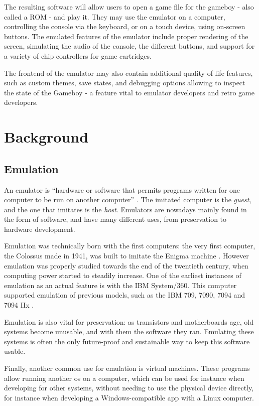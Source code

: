 \documentclass[11pt]{report}
\begin{document}
The resulting software will allow users to open a game file for the gameboy - also called a ROM - and play it. They may use the emulator on a computer, controlling the console via the keyboard, or on a touch device, using on-screen buttons. The emulated features of the emulator include proper rendering of the screen, simulating the audio of the console, the different buttons, and support for a variety of chip controllers for game cartridges.

The frontend of the emulator may also contain additional quality of life features, such as custom themes, save states, and debugging options allowing to inspect the state of the Gameboy - a feature vital to emulator developers and retro game developers.

\chapter{Background}

\section{Emulation}

An emulator is ``hardware or software that permits programs written for one computer to be run on another computer'' \cite{emulator_def}. The imitated computer is the \textit{guest}, and the one that imitates is the \textit{host}. Emulators are nowadays mainly found in the form of software, and have many different uses, from preservation to hardware development.

Emulation was technically born with the first computers: the very first computer, the Colossus made in 1941, was built to imitate the Enigma machine \cite{emulator_origin}. However emulation was properly studied towards the end of the twentieth century, when computing power started to steadily increase. One of the earliest instances of emulation as an actual feature is with the IBM System/360. This computer supported emulation of previous models, such as the IBM 709, 7090, 7094 and 7094 IIx \cite{ibm_emulation}.

Emulation is also vital for preservation: as transistors and motherboards age, old systems become unusable, and with them the software they ran. Emulating these systems is often the only future-proof and sustainable way to keep this software usable.

Finally, another common use for emulation is virtual machines. These programs allow running another \gls{os} on a computer, which can be used for instance when developing for other systems, without needing to use the physical device directly, for instance when developing a Windows-compatible app with a Linux computer.
\end{document}
